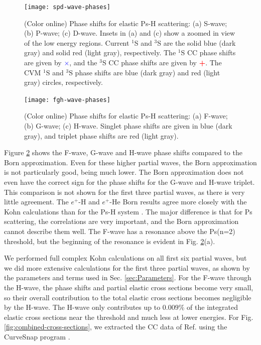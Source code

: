 \documentclass[preprint,showpacs,preprintnumbers,amsmath,amssymb]{revtex4}
\begin{document}
\begin{figure}[H]
	\centering
	\texttt{[image: spd-wave-phases]}
	\caption{(Color online) Phase shifts for elastic Ps-H scattering: (a) S-wave; (b) P-wave; (c) D-wave. Insets in (a) and (c) show a zoomed in view of the low energy regions. Current $^1$S and $^3$S are the solid blue (dark gray) and solid red (light gray), respectively. The $^1$S CC phase shifts \cite{Walters2004} are given by \mbox{\textcolor{blue}{$\times$}}, and the $^3$S CC phase shifts \cite{Blackwood2002} are given by \mbox{\textcolor{red}{\textbf{+}}}. The CVM $^1$S and $^3$S phase shifts \cite{Zhang2012} are blue (dark gray) and red (light gray) circles, respectively.}
	\label{fig:spd-wave-phases}
\end{figure}

\begin{figure}[H]
	\centering
	\texttt{[image: fgh-wave-phases]}
	\caption{(Color online) Phase shifts for elastic Ps-H scattering: (a) F-wave; (b) G-wave; (c) H-wave. Singlet phase shifts are given in blue (dark gray), and triplet phase shifts are red (light gray).}
	\label{fig:fgh-wave-phases}
\end{figure}

Figure \ref{fig:fgh-wave-phases} shows the F-wave, G-wave and H-wave phase shifts compared to the Born approximation. Even for these higher partial waves, the Born approximation is not particularly good, being much lower. The Born approximation does not even have the correct sign for the phase shifts for the G-wave and H-wave triplet. This comparison is not shown for the first three partial waves, as there is very little agreement. The $e^+$-H and $e^+$-He Born results agree more closely with the Kohn calculations than for the Ps-H system \cite{?}. The major difference is that for Ps scattering, the correlations are very important, and the Born approximation cannot describe them well. The F-wave has a resonance above the Ps(n=2) threshold, but the beginning of the resonance is evident in Fig. \ref{fig:fgh-wave-phases}(a).

We performed full complex Kohn calculations on all first six partial waves, but we did more extensive calculations for the first three partial waves, as shown by the parameters and terms used in Sec. \ref{sec:Parameters}. For the F-wave through the H-wave, the phase shifts and partial elastic cross sections become very small, so their overall contribution to the total elastic cross sections becomes negligible by the H-wave. The H-wave only contributes up to $0.009\%$ of the integrated elastic cross sections near the threshold and much less at lower energies. For Fig. \ref{fig:combined-cross-sections}, we extracted the CC data of Ref. \cite{Walters2004} using the CurveSnap program \cite{CurveSnap}.
\end{document}
